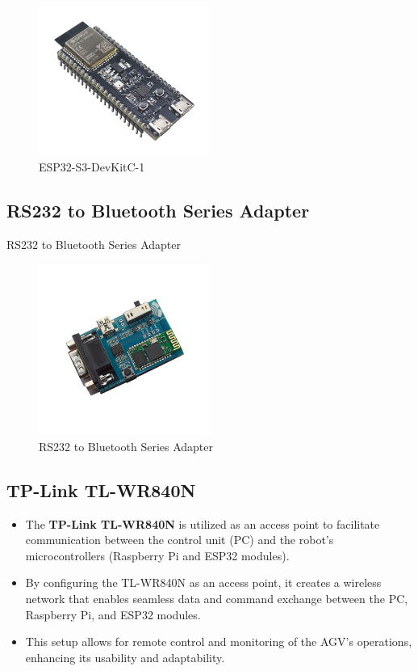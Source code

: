 \documentclass[../../main]{subfiles}
\begin{document}
\begin{figure}[H]
    \centering
    \includegraphics[width=0.5\textwidth]{fig/esp32.png}
    \caption{ ESP32-S3-DevKitC-1}
    \label{ESP32-S3-DevKitC-1} %
\end{figure}

\subsection{RS232 to Bluetooth Series Adapter}
RS232 to Bluetooth Series Adapter
\begin{figure}[H]
    \centering
    \includegraphics[width=0.5\textwidth]{fig/bluetooth.jpg}
    \caption{ RS232 to Bluetooth Series Adapter}
    \label{RS232 to Bluetooth Series Adapter} %
\end{figure}

\subsection{TP-Link TL-WR840N}
\begin{itemize}
    \item The \textbf{TP-Link TL-WR840N} is utilized as an access point 
    to facilitate communication between the control unit (PC) and the 
    robot's microcontrollers (Raspberry Pi and ESP32 modules).
    \item By configuring the TL-WR840N as an access point, it creates 
    a wireless network that enables seamless data and command exchange 
    between the PC, Raspberry Pi, and ESP32 modules.
    \item This setup allows for remote control and monitoring of the 
    AGV's operations, enhancing its usability and adaptability.
\end{itemize}
\end{document}
